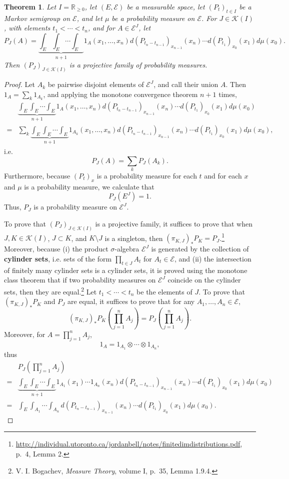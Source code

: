 \documentclass{article}
\newtheorem{theorem}{Theorem}
\theoremstyle{definition}
\begin{document}
\begin{theorem}
Let $I=\mathbb{R}_{\geq 0}$,
let $(E,\mathscr{E})$ be a measurable space, let $(P_t)_{t \in I}$ be a Markov semigroup 
on $\mathscr{E}$, and let $\mu$ be a probability measure on $\mathscr{E}$. For 
$J \in \mathscr{K}(I)$, with elements $t_1<\cdots<t_n$, and for $A \in \mathscr{E}^J$,
let
\[
P_J(A) = \underbrace{\int_E \int_E \cdots \int_E}_{n+1} 1_A(x_1,\ldots,x_n) d(P_{t_n-t_{n-1}})_{x_{n-1}}(x_n)
\cdots d(P_{t_1})_{x_0}(x_1) d\mu(x_0).
\]
Then $(P_J)_{J \in \mathscr{K}(I)}$ is a projective family of probability measures.
\label{projective}
\end{theorem}
\begin{proof}
Let $A_k$ be pairwise disjoint elements of $\mathscr{E}^J$, and call their union $A$. 
Then $1_A = \sum_k 1_{A_k}$,
and applying the monotone convergence theorem $n+1$ times,
\[
\begin{split}
& \underbrace{\int_E \int_E \cdots \int_E}_{n+1} 1_A(x_1,\ldots,x_n) d(P_{t_n-t_{n-1}})_{x_{n-1}}(x_n)
\cdots d(P_{t_1})_{x_0}(x_1) d\mu(x_0)\\
=&\sum_k  \underbrace{\int_E \int_E \cdots \int_E}_{n+1}  1_{A_k}(x_1,\ldots,x_n) d(P_{t_n-t_{n-1}})_{x_{n-1}}(x_n)
\cdots d(P_{t_1})_{x_0}(x_1) d\mu(x_0),
\end{split}
\]
i.e.
\[
P_J(A) = \sum_k P_J(A_k).
\]
Furthermore, because $(P_t)_x$ is a probability measure for each $t$ and for each $x$ and $\mu$ is a probability measure, we calculate that
\[
P_J(E^J) = 1.
\]
Thus, $P_J$ is a probability measure on $\mathscr{E}^J$. 

To prove that $(P_J)_{J \in \mathscr{K}(I)}$ is a projective family, it suffices to prove that when $J,K \in \mathscr{K}(I)$,
$J \subset K$, and $K \setminus J$ is a singleton, then $(\pi_{K,J})_* P_K = P_J$.\footnote{\url{http://individual.utoronto.ca/jordanbell/notes/finitedimdistributions.pdf},
p.~4, Lemma 2.} Moreover, 
because (i) the product $\sigma$-algebra $\mathscr{E}^J$ is generated by the collection of \textbf{cylinder sets}, i.e. sets
of the form $\prod_{t \in J} A_t$ for $A_t \in \mathscr{E}$, and (ii)  the intersection of finitely many cylinder sets is a cylinder sets,
it is proved using  the monotone class theorem that if two probability measures on $\mathscr{E}^J$  coincide on the cylinder
sets, then they are equal.\footnote{V. I. Bogachev, {\em Measure Theory}, volume I, p.~35, Lemma 1.9.4.}
Let $t_1<\cdots<t_n$ be the elements of $J$. To prove that 
$(\pi_{K,J})_* P_K$ and
$P_J$ are equal, it suffices to prove that
for any $A_1,\ldots,A_n \in \mathscr{E}$,
\[
(\pi_{K,J})_* P_K\left(\prod_{j=1}^n A_j\right) = P_J\left(\prod_{j=1}^n A_j\right).
\]
Moreover, for $A=\prod_{j=1}^n A_j$,
\[
1_A = 1_{A_1} \otimes \cdots \otimes 1_{A_n}, 
\]
thus
\[
\begin{split}
&P_J\left(\prod_{j=1}^n A_j\right)\\
=& \underbrace{\int_E \int_E \cdots \int_E}_{n+1} 1_{A_1}(x_1)\cdots 1_{A_n}(x_n) d(P_{t_n-t_{n-1}})_{x_{n-1}}(x_n)
\cdots d(P_{t_1})_{x_0}(x_1) d\mu(x_0)\\
=&\int_E \int_{A_1} \cdots \int_{A_n}
d(P_{t_n-t_{n-1}})_{x_{n-1}}(x_n)
\cdots d(P_{t_1})_{x_0}(x_1) d\mu(x_0).
\end{split}
\]


\end{proof}
\end{document}
